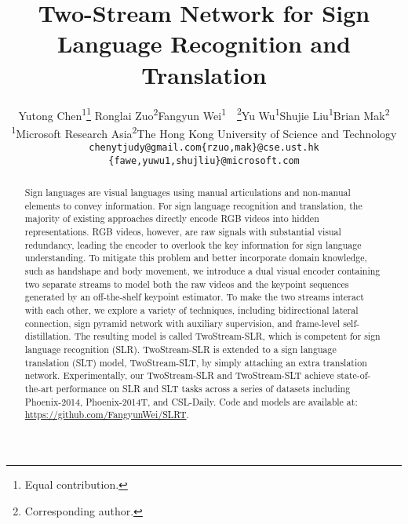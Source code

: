 \documentclass{article}
\title{Two-Stream Network for Sign Language Recognition and Translation}
\author{Yutong Chen\textsuperscript{\rm 1}\thanks{Equal contribution.} \quad Ronglai Zuo\textsuperscript{\rm 2}\footnotemark[1] \quad Fangyun Wei\textsuperscript{\rm 1}\footnotemark[1]~~\thanks{Corresponding author.}\quad Yu Wu\textsuperscript{\rm 1}\quad Shujie Liu\textsuperscript{\rm 1}\quad Brian Mak\textsuperscript{\rm 2}\\
  \textsuperscript{\rm 1}Microsoft Research Asia\quad \textsuperscript{\rm 2}The Hong Kong University of Science and Technology\\
  \texttt{chenytjudy@gmail.com}\quad \texttt{\{rzuo,mak\}@cse.ust.hk} \\
  \texttt{\{fawe,yuwu1,shujliu\}@microsoft.com} \\
}
\begin{document}
\maketitle


\begin{abstract}
Sign languages are visual languages using manual articulations and non-manual elements to convey information. For sign language recognition and translation, the majority of existing approaches directly encode RGB videos into hidden representations. RGB videos, however, are raw signals with substantial visual redundancy, leading the encoder to overlook the key information for sign language understanding. To mitigate this problem and better incorporate domain knowledge, such as handshape and body movement, we introduce a dual visual encoder containing two separate streams to model both the raw videos and the keypoint sequences generated by an off-the-shelf keypoint estimator. To make the two streams interact with each other, we explore a variety of techniques, including bidirectional lateral connection, sign pyramid network with auxiliary supervision, and frame-level self-distillation. The resulting model is called TwoStream-SLR, which is competent for sign language recognition (SLR). TwoStream-SLR is extended to a sign language translation (SLT) model, TwoStream-SLT, by simply attaching an extra translation network. Experimentally, our TwoStream-SLR and TwoStream-SLT achieve state-of-the-art performance on SLR and SLT tasks across a series of datasets including Phoenix-2014, Phoenix-2014T, and CSL-Daily. Code and models are available at: \url{https://github.com/FangyunWei/SLRT}.

\end{abstract}
\end{document}
